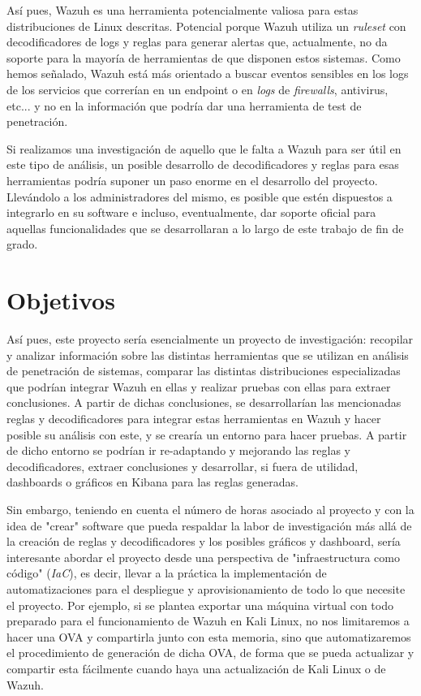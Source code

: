 Así pues, Wazuh es una herramienta potencialmente valiosa para estas distribuciones de Linux descritas. Potencial porque Wazuh utiliza un \textit{ruleset} con decodificadores de logs y reglas para generar alertas que, actualmente, no da soporte para la mayoría de herramientas de que disponen estos sistemas. Como hemos señalado, Wazuh está más orientado a buscar eventos sensibles en los logs de los servicios que correrían en un endpoint o en \textit{logs} de \textit{firewalls}, antivirus, etc... y no en la información que podría dar una herramienta de test de penetración.

Si realizamos una investigación de aquello que le falta a Wazuh para ser útil en este tipo de análisis, un posible desarrollo de decodificadores y reglas para esas herramientas podría suponer un paso enorme en el desarrollo del proyecto. Llevándolo a los administradores del mismo, es posible que estén dispuestos a integrarlo en su software e incluso, eventualmente, dar soporte oficial para aquellas funcionalidades que se desarrollaran a lo largo de este trabajo de fin de grado.


\section{Objetivos}

Así pues, este proyecto sería esencialmente un proyecto de investigación: recopilar y analizar información sobre las distintas herramientas que se utilizan en análisis de penetración de sistemas, comparar las distintas distribuciones especializadas que podrían integrar Wazuh en ellas y realizar pruebas con ellas para extraer conclusiones. A partir de dichas conclusiones, se desarrollarían las mencionadas reglas y decodificadores para integrar estas herramientas en Wazuh y hacer posible su análisis con este, y se crearía un entorno para hacer pruebas. A partir de dicho entorno se podrían ir re-adaptando y mejorando las reglas y decodificadores, extraer conclusiones y desarrollar, si fuera de utilidad, dashboards o gráficos en Kibana para las reglas generadas.

Sin embargo, teniendo en cuenta el número de horas asociado al proyecto y con la idea de "crear" software que pueda respaldar la labor de investigación más allá de la creación de reglas y decodificadores y los posibles gráficos y dashboard, sería interesante abordar el proyecto desde una perspectiva de "infraestructura como código" (\textit{IaC}), es decir, llevar a la práctica la implementación de automatizaciones para el despliegue y aprovisionamiento de todo lo que necesite el proyecto. Por ejemplo, si se plantea exportar una máquina virtual con todo preparado para el funcionamiento de Wazuh en Kali Linux, no nos limitaremos a hacer una OVA y compartirla junto con esta memoria, sino que automatizaremos el procedimiento de generación de dicha OVA, de forma que se pueda actualizar y compartir esta fácilmente cuando haya una actualización de Kali Linux o de Wazuh.

